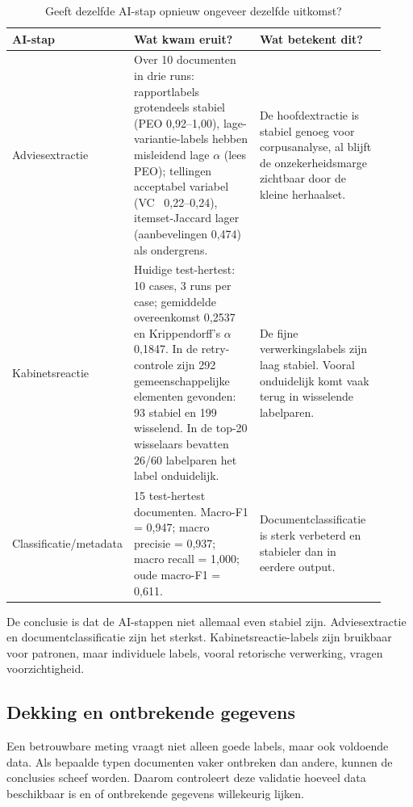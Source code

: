 \begin{table}[htbp]
\centering
\small
\caption{Geeft dezelfde AI-stap opnieuw ongeveer dezelfde uitkomst?}
\label{tab:dv2-interne-stabiliteit}
\begin{tabular}{p{0.24\linewidth}p{0.34\linewidth}p{0.34\linewidth}}
\hline
AI-stap & Wat kwam eruit? & Wat betekent dit? \\
\hline
Adviesextractie & Over 10 documenten in drie runs: rapportlabels grotendeels stabiel (PEO 0,92--1,00), lage-variantie-labels hebben misleidend lage $\alpha$ (lees PEO); tellingen acceptabel variabel (VC ~0,22--0,24), itemset-Jaccard lager (aanbevelingen 0,474) als ondergrens. & De hoofdextractie is stabiel genoeg voor corpusanalyse, al blijft de onzekerheidsmarge zichtbaar door de kleine herhaalset. \\
Kabinetsreactie & Huidige test-hertest: 10 cases, 3 runs per case; gemiddelde overeenkomst 0,2537 en Krippendorff's $\alpha$ 0,1847. In de retry-controle zijn 292 gemeenschappelijke elementen gevonden: 93 stabiel en 199 wisselend. In de top-20 wisselaars bevatten 26/60 labelparen het label onduidelijk. & De fijne verwerkingslabels zijn laag stabiel. Vooral onduidelijk komt vaak terug in wisselende labelparen. \\
Classificatie/metadata & 15 test-hertest documenten. Macro-F1 = 0,947; macro precisie = 0,937; macro recall = 1,000; oude macro-F1 = 0,611. & Documentclassificatie is sterk verbeterd en stabieler dan in eerdere output. \\
\hline
\end{tabular}
\end{table}

De conclusie is dat de AI-stappen niet allemaal even stabiel zijn. Adviesextractie en documentclassificatie zijn het sterkst. Kabinetsreactie-labels zijn bruikbaar voor patronen, maar individuele labels, vooral retorische verwerking, vragen voorzichtigheid.

\subsection{Dekking en ontbrekende gegevens}
\label{subsec:dv2-dekking-missingness}

Een betrouwbare meting vraagt niet alleen goede labels, maar ook voldoende data. Als bepaalde typen documenten vaker ontbreken dan andere, kunnen de conclusies scheef worden. Daarom controleert deze validatie hoeveel data beschikbaar is en of ontbrekende gegevens willekeurig lijken.

